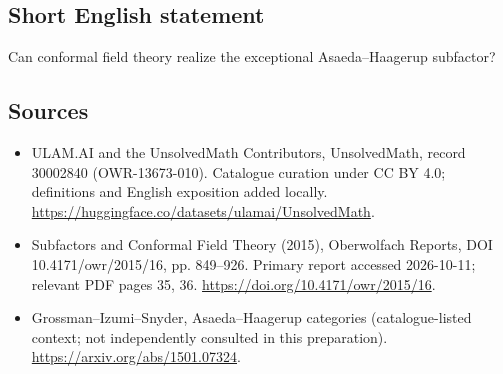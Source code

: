 \documentclass[11pt]{article}
\begin{document}
\subsection{Short English statement}
Can conformal field theory realize the exceptional Asaeda--Haagerup subfactor?
\subsection{Sources}
\begin{itemize}
\item[\hypertarget{source:30002840:1}{S1}] ULAM.AI and the UnsolvedMath Contributors, UnsolvedMath, record 30002840 (OWR-13673-010). Catalogue curation under CC BY 4.0; definitions and English exposition added locally.
\url{https://huggingface.co/datasets/ulamai/UnsolvedMath}.
\item[\hypertarget{source:30002840:2}{S2}] Subfactors and Conformal Field Theory (2015), Oberwolfach Reports, DOI 10.4171/owr/2015/16, pp. 849--926. Primary report accessed 2026-10-11; relevant PDF pages 35, 36.
\url{https://doi.org/10.4171/owr/2015/16}.
\item[\hypertarget{source:30002840:3}{S3}] Grossman--Izumi--Snyder, Asaeda--Haagerup categories (catalogue-listed context; not independently consulted in this preparation).
\url{https://arxiv.org/abs/1501.07324}.
\end{itemize}
\label{end:30002840}
\end{document}
